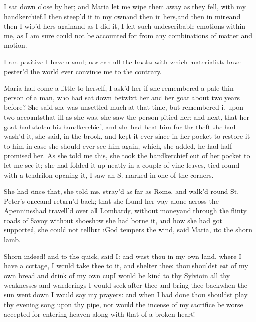 \documentclass[twoside]{article}
\begin{document}
I sat down close by her; and Maria let me
wipe them away as they fell, with my
handkerchief.\tskk I then steep’d it in my
own\tskk and then in hers,\tskk and then
in mine\tskk and then I wip’d hers
again\tskk and as I did it, I felt such
undescribable emotions within me, as I am
sure could not be accounted for from any
combinations of matter and motion.

I am positive I have a soul; nor can all
the books with which materialists have
pester’d the world ever convince me to the
contrary.





\vskip 6pt


 Maria had come a little
to herself, I ask’d her if she remembered
a pale thin person of a man, who had sat
down betwixt her and her goat about two
years before?  She said she was unsettled
much at that time, but remembered it upon
two accounts\tskk that ill as she was,
she saw the person pitied her; and next,
that her goat had stolen his handkerchief,
and she had beat him for the theft\tskk
she had wash’d it, she said, in the brook,
and kept it ever since in her pocket to
restore it to him in case she should ever
see him again, which, she added, he had
half promised her.  As she told me this,
she took the handkerchief out of her
pocket to let me see it; she had folded it
up neatly in a couple of vine leaves, tied
round with a tendril\tskk on opening it,
I saw an S. marked in one of the corners.

She had since that, she told me, stray’d
as far as Rome, and walk’d round St.
Peter’s once\tskk and return’d back;\tskk
that she found her way alone across the
Apennines\tskk had travell’d over all
Lombardy, without money\tskk and through
the flinty roads of Savoy without
shoes\tskk how she had borne it, and how
she had got supported, she could not
tell\tskk but \i{God tempers the wind},
said Maria, \i{to the shorn lamb}.

Shorn indeed! and to the quick, said I:
and wast thou in my own land, where I have
a cottage, I would take thee to it, and
shelter thee: thou shouldst eat of my own
bread and drink of my own cup\tskk I
would be kind to thy Sylvio\tskk in all
thy weaknesses and wanderings I would seek
after thee and bring thee back\tskk when
the sun went down I would say my prayers:
and when I had done thou shouldst play thy
evening song upon thy pipe, nor would the
incense of my sacrifice be worse accepted
for entering heaven along with that of a
broken heart!
\end{document}
